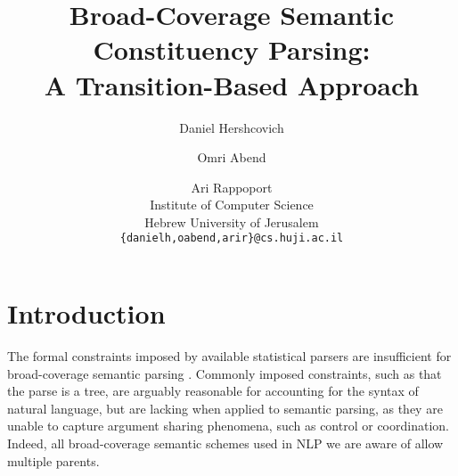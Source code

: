\documentclass[11pt]{article}
\title{Broad-Coverage Semantic Constituency Parsing: \\
A Transition-Based Approach}
\author{Daniel Hershcovich \and Omri Abend \and Ari Rappoport \\
  Institute of Computer Science \\
  Hebrew University of Jerusalem \\
  {\tt \{danielh,oabend,arir\}@cs.huji.ac.il}
}
\date{}
\begin{document}
\maketitle

\begin{abstract}

  
\end{abstract}



\section{Introduction}

The formal constraints imposed by available statistical parsers are insufficient for
broad-coverage semantic parsing \cite{oepen2015semeval}.
Commonly imposed constraints, such as that the parse is a tree, are arguably reasonable for
accounting for the syntax of natural language, but are lacking when applied to semantic parsing,
as they are unable to capture argument sharing phenomena, such as control or coordination.
Indeed, all broad-coverage semantic schemes used in NLP we are aware of allow multiple parents.
\end{document}
